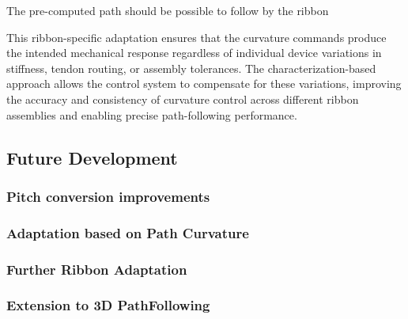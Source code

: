 The pre-computed path should be possible to follow by the ribbon

This ribbon-specific adaptation ensures that the curvature commands produce the intended mechanical response regardless of individual device variations in stiffness, tendon routing, or assembly tolerances. The characterization-based approach allows the control system to compensate for these variations, improving the accuracy and consistency of curvature control across different ribbon assemblies and enabling precise path-following performance.



\subsection{Future Development}

\subsubsection{Pitch conversion improvements}

\subsubsection{Adaptation based on Path Curvature}

\subsubsection{Further Ribbon Adaptation}


\subsubsection{Extension to 3D PathFollowing}





